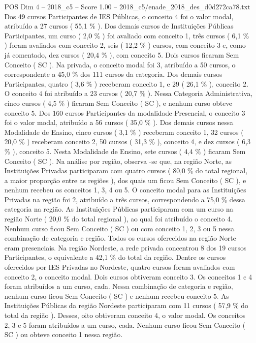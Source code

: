 \begin{textsample}{POS Dim 4 – 2018\_c5 – Score 1.00 – 2018\_c5/enade\_2018\_des\_d0d272ca78.txt}
Dos 49 cursos Participantes de IES Públicas, o conceito 4 foi o valor modal, atribuído a 27 cursos ( 55,1 \% ).
Dos demais cursos de Instituições Públicas Participantes, um curso ( 2,0 \% ) foi avaliado com conceito 1, três cursos ( 6,1 \% ) foram avaliados com conceito 2, seis ( 12,2 \% ) cursos, com conceito 3 e, como já comentado, dez cursos ( 20,4 \% ), com conceito 5.
Dois cursos ficaram Sem Conceito ( SC ).
Na privada, o conceito modal foi 3, atribuído a 50 cursos, o correspondente a 45,0 \% dos 111 cursos da categoria.
Dos demais cursos Participantes, quatro ( 3,6 \% ) receberam conceito 1, e 29 ( 26,1 \% ), conceito 2.
O conceito 4 foi atribuído a 23 cursos ( 20,7 \% ).
Nessa Categoria Administrativa, cinco cursos ( 4,5 \% ) ficaram Sem Conceito ( SC ), e nenhum curso obteve conceito 5.
Dos 160 cursos Participantes da modalidade Presencial, o conceito 3 foi o valor modal, atribuído a 56 cursos ( 35,0 \% ).
Dos demais cursos nessa Modalidade de Ensino, cinco cursos ( 3,1 \% ) receberam conceito 1, 32 cursos ( 20,0 \% ) receberam conceito 2, 50 cursos ( 31,3 \% ), conceito 4, e dez cursos ( 6,3 \% ), conceito 5.
Nesta Modalidade de Ensino, sete cursos ( 4,4 \% ) ficaram Sem Conceito ( SC ).
Na análise por região, observa -se que, na região Norte, as Instituições Privadas participaram com quatro cursos ( 80,0 \% do total regional, a maior proporção entre as regiões ), dos quais um ficou Sem Conceito ( SC ), e nenhum recebeu os conceitos 1, 3, 4 ou 5.
O conceito modal para as Instituições Privadas na região foi 2, atribuído a três cursos, correspondendo a 75,0 \% dessa categoria na região.
As Instituições Públicas participaram com um curso na região Norte ( 20,0 \% do total regional ), ao qual foi atribuído o conceito 4.
Nenhum curso ficou Sem Conceito ( SC ) ou com conceito 1, 2, 3 ou 5 nessa combinação de categoria e região.
Todos os cursos oferecidos na região Norte eram presenciais.
Na região Nordeste, a rede privada concentrou 8 dos 19 cursos Participantes, o equivalente a 42,1 \% do total da região.
Dentre os cursos oferecidos por IES Privadas no Nordeste, quatro cursos foram avaliados com conceito 2, o conceito modal.
Dois cursos obtiveram conceito 3.
Os conceitos 1 e 4 foram atribuídos a um curso, cada.
Nessa combinação de categoria e região, nenhum curso ficou Sem Conceito ( SC ) e nenhum recebeu conceito 5.
As Instituições Públicas da região Nordeste participaram com 11 cursos ( 57,9 \% do total da região ).
Desses, oito obtiveram conceito 4, o valor modal.
Os conceitos 2, 3 e 5 foram atribuídos a um curso, cada.
Nenhum curso ficou Sem Conceito ( SC ) ou obteve conceito 1 nessa região.

\end{textsample}

